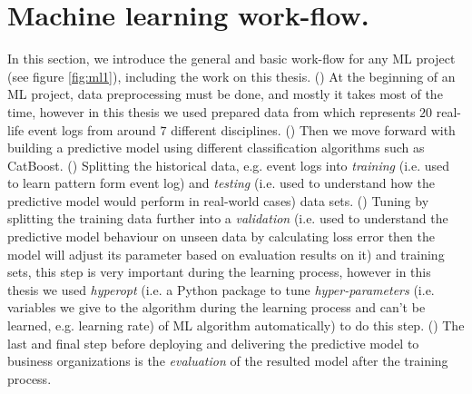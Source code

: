 \section{Machine learning work-flow.}
In this section, we introduce the general and basic work-flow for any ML project (see figure \ref{fig:ml1}), including the work on this thesis. () At the beginning of an ML project, data preprocessing must be done, and mostly it takes most of the time, however in this thesis we used prepared data from \cite{teinemaa2019outcome} which represents $20$ real-life event logs from around $7$ different disciplines. () Then we move forward with building a predictive model using different classification algorithms such as CatBoost. () Splitting the historical data, e.g. event logs into \textit{training} (i.e. used to learn pattern form event log) and \textit{testing} (i.e. used to understand how the predictive model would perform in real-world cases) data sets. () Tuning by splitting the training data further into a \textit{validation} (i.e. used to understand the predictive model behaviour on unseen data by calculating loss error then the model will adjust its parameter based on evaluation results on it) and training sets, this step is very important during the learning process, however in this thesis we used \textit{hyperopt} \cite{bergstra2013hyperopt} (i.e. a Python package to tune \textit{hyper-parameters} (i.e. variables we give to the algorithm during the learning process and can’t be learned, e.g. learning rate) of ML algorithm automatically) to do this step. () The last and final step before deploying and delivering the predictive model to business organizations is the \textit{evaluation} of the resulted model after the training process.


